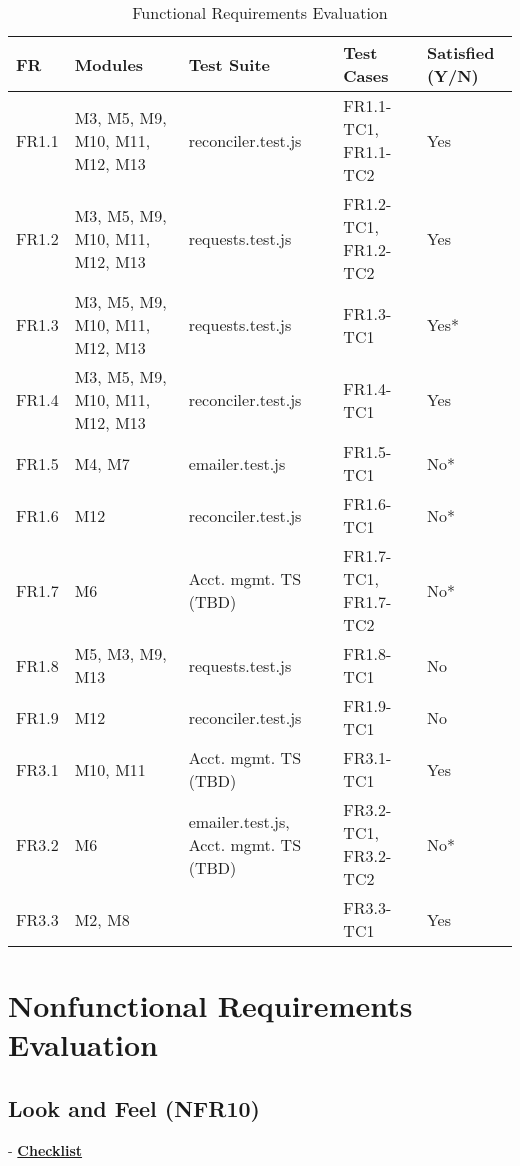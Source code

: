 \documentclass[12pt, titlepage]{article}
\begin{document}
\begin{table}[ht]
    \centering
    \footnotesize
    \caption{Functional Requirements Evaluation}
    \label{tab:FReval}
    \begin{tabular}{|p{1.2cm}|p{2.7cm}|p{2.4cm}|p{2.2cm}|p{1.4cm}|}
    \hline
    \textbf{FR} & \textbf{Modules} & \textbf{Test Suite} & \textbf{Test Cases} & \textbf{Satisfied (Y/N)} \\
    \hline
    FR1.1 & M3, M5, M9, M10, M11, M12, M13 & reconciler.test.js & FR1.1-TC1, FR1.1-TC2 & Yes \\
    \hline
    FR1.2 & M3, M5, M9, M10, M11, M12, M13 & requests.test.js & FR1.2-TC1, FR1.2-TC2 & Yes\\
    \hline
    FR1.3 & M3, M5, M9, M10, M11, M12, M13 & requests.test.js & FR1.3-TC1 & Yes*\\
    \hline
    FR1.4 & M3, M5, M9, M10, M11, M12, M13 & reconciler.test.js & FR1.4-TC1 & Yes\\
    \hline
    FR1.5 & M4, M7 & emailer.test.js & FR1.5-TC1 & No*\\
    \hline
    FR1.6 & M12 & reconciler.test.js & FR1.6-TC1 & No*\\
    \hline
    FR1.7 & M6 & Acct. mgmt. TS (TBD) & FR1.7-TC1, FR1.7-TC2 & No*\\
    \hline
    FR1.8 & M5, M3, M9, M13 & requests.test.js & FR1.8-TC1 & No\\
    \hline
    FR1.9 & M12 & reconciler.test.js & FR1.9-TC1 & No\\
    \hline
    FR3.1 & M10, M11 & Acct. mgmt. TS (TBD) & FR3.1-TC1 & Yes\\
    \hline
    FR3.2 & M6 & emailer.test.js, Acct. mgmt. TS (TBD) & FR3.2-TC1, FR3.2-TC2 & No*\\
    \hline
    FR3.3 & M2, M8 & & FR3.3-TC1 & Yes\\
    \hline
    \end{tabular}
    \normalsize
\end{table}

\newpage

\section{Nonfunctional Requirements Evaluation}

\subsection{Look and Feel (NFR10)}- \textbf{\hyperlink{checklist-nfr10}{Checklist}}
\label{nfr10}
\end{document}
